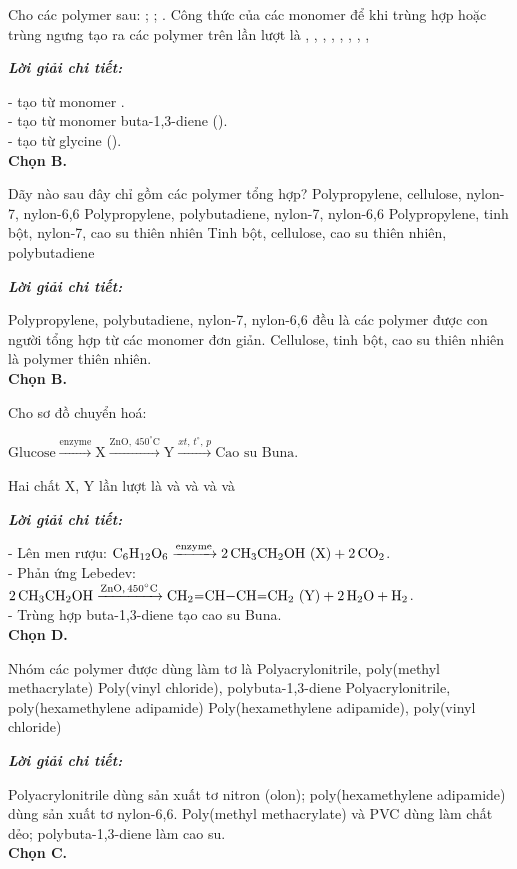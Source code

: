 \documentclass[11pt,a4paper]{article}
\def\loigiai#1{
\par\begingroup\color{blue!80!black}\small
\noindent\textbf{\textit{Lời giải chi tiết:}}\par
#1\par\endgroup}
\begin{document}
\begin{ex}
Cho các polymer sau: ; ; . Công thức của các monomer để khi trùng hợp hoặc trùng ngưng tạo ra các polymer trên lần lượt là
\choice
{, , }
{\True {}, , }
{, , }
{, , }
\loigiai{
-  tạo từ monomer \ce{CH2=CH2}.\\
- \ce{[-CH2-CH=CH-CH2-]_n} tạo từ monomer buta-1,3-diene (\ce{CH2=CH-CH=CH2}).\\
- \ce{[-NH-CH2-CO-]_n} tạo từ glycine (\ce{H2N-CH2-COOH}).\\
\textbf{Chọn B.}}
\end{ex}

\begin{ex}
Dãy nào sau đây chỉ gồm các polymer tổng hợp?
\choice
{Polypropylene, cellulose, nylon-7, nylon-6,6}
{\True Polypropylene, polybutadiene, nylon-7, nylon-6,6}
{Polypropylene, tinh bột, nylon-7, cao su thiên nhiên}
{Tinh bột, cellulose, cao su thiên nhiên, polybutadiene}
\loigiai{
Polypropylene, polybutadiene, nylon-7, nylon-6,6 đều là các polymer được con người tổng hợp từ các monomer đơn giản. Cellulose, tinh bột, cao su thiên nhiên là polymer thiên nhiên.\\
\textbf{Chọn B.}}
\end{ex}

\begin{ex}
Cho sơ đồ chuyển hoá:
\centerline{$\text{Glucose} \xrightarrow{\text{enzyme}} \text{X} \xrightarrow{\text{ZnO},\, 450^\circ\text{C}} \text{Y} \xrightarrow{xt,\, t^\circ,\, p} \text{Cao su Buna.}$}
Hai chất X, Y lần lượt là
\choice
{ và }
{ và }
{ và }
{\True {} và }
\loigiai{
- Lên men rượu: $\ce{C6H12O6} \xrightarrow{\text{enzyme}} 2\,\ce{CH3CH2OH}\text{ (X)} + 2\,\ce{CO2}$.\\
- Phản ứng Lebedev: $2\,\ce{CH3CH2OH} \xrightarrow{\text{ZnO},\, 450^\circ\text{C}} \ce{CH2=CH-CH=CH2}\text{ (Y)} + 2\,\ce{H2O} + \ce{H2}$.\\
- Trùng hợp buta-1,3-diene tạo cao su Buna.\\
\textbf{Chọn D.}}
\end{ex}

\begin{ex}
Nhóm các polymer được dùng làm tơ là
\choice
{Polyacrylonitrile, poly(methyl methacrylate)}
{Poly(vinyl chloride), polybuta-1,3-diene}
{\True Polyacrylonitrile, poly(hexamethylene adipamide)}
{Poly(hexamethylene adipamide), poly(vinyl chloride)}
\loigiai{
Polyacrylonitrile dùng sản xuất tơ nitron (olon); poly(hexamethylene adipamide) dùng sản xuất tơ nylon-6,6. Poly(methyl methacrylate) và PVC dùng làm chất dẻo; polybuta-1,3-diene làm cao su.\\
\textbf{Chọn C.}}
\end{ex}
\end{document}
